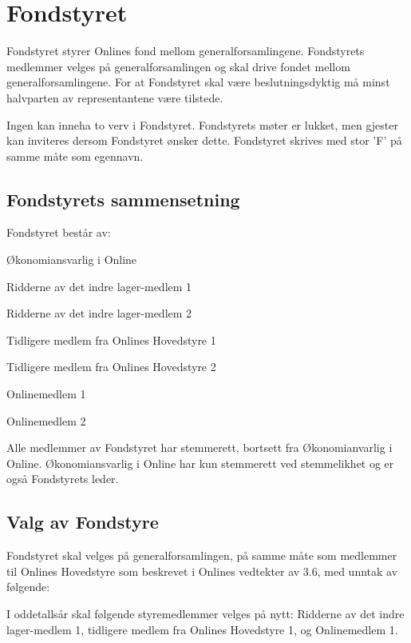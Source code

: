 \chapter{Fondstyret}
\vsapce{23pt}

Fondstyret styrer Onlines fond mellom generalforsamlingene. Fondstyrets medlemmer velges på generalforsamlingen og skal drive fondet mellom generalforsamlingene. For at Fondstyret skal være beslutningsdyktig må minst halvparten av representantene være tilstede.

Ingen kan inneha to verv i Fondstyret. Fondstyrets møter er lukket, men gjester kan inviteres dersom Fondstyret ønsker dette. Fondstyret skrives med stor ’F’ på samme måte som egennavn.

\section{Fondstyrets sammensetning}


Fondstyret består av:

\begin{liste}
  \item Økonomiansvarlig i Online
  \item Ridderne av det indre lager-medlem 1
  \item Ridderne av det indre lager-medlem 2
  \item Tidligere medlem fra Onlines Hovedstyre 1
  \item Tidligere medlem fra Onlines Hovedstyre 2
  \item Onlinemedlem 1
  \item Onlinemedlem 2
\end{liste}

Alle medlemmer av Fondstyret har stemmerett, bortsett fra Økonomianvarlig i Online. Økonomiansvarlig i Online har kun stemmerett ved stemmelikhet og er også Fondstyrets leder.

\section{Valg av Fondstyre}


Fondstyret skal velges på generalforsamlingen, på samme måte som medlemmer til Onlines Hovedstyre som beskrevet i Onlines vedtekter av 3.6, med unntak av følgende:

I oddetallsår skal følgende styremedlemmer velges på nytt: Ridderne av det indre lager-medlem 1, tidligere medlem fra Onlines Hovedstyre 1, og Onlinemedlem 1.

